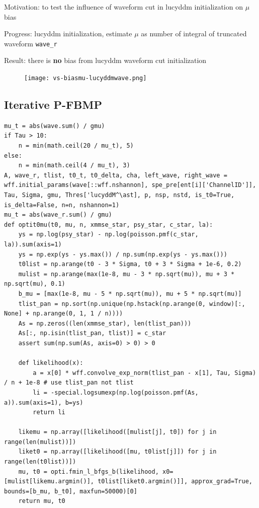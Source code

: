 \documentclass[notitlepage]{article}
\begin{document}
Motivation: to test the influence of waveform cut in lucyddm initialization on $\mu$ bias

Progress: lucyddm initialization, estimate $\mu$ as number of integral of truncated waveform \texttt{wave\_r}

Result: there is \textbf{no} bias from lucyddm waveform cut initialization

\begin{figure}[H]
    \centering
    \texttt{[image: vs-biasmu-lucyddmwave.png]}
\end{figure}

\subsection{Iterative P-FBMP}

\begin{lstlisting}
mu_t = abs(wave.sum() / gmu)
if Tau > 10:
    n = min(math.ceil(20 / mu_t), 5)
else:
    n = min(math.ceil(4 / mu_t), 3)
A, wave_r, tlist, t0_t, t0_delta, cha, left_wave, right_wave = wff.initial_params(wave[::wff.nshannon], spe_pre[ent[i]['ChannelID']], Tau, Sigma, gmu, Thres['lucyddM^\ast], p, nsp, nstd, is_t0=True, is_delta=False, n=n, nshannon=1)
mu_t = abs(wave_r.sum() / gmu)
def optit0mu(t0, mu, n, xmmse_star, psy_star, c_star, la):
    ys = np.log(psy_star) - np.log(poisson.pmf(c_star, la)).sum(axis=1)
    ys = np.exp(ys - ys.max()) / np.sum(np.exp(ys - ys.max()))
    t0list = np.arange(t0 - 3 * Sigma, t0 + 3 * Sigma + 1e-6, 0.2)
    mulist = np.arange(max(1e-8, mu - 3 * np.sqrt(mu)), mu + 3 * np.sqrt(mu), 0.1)
    b_mu = [max(1e-8, mu - 5 * np.sqrt(mu)), mu + 5 * np.sqrt(mu)]
    tlist_pan = np.sort(np.unique(np.hstack(np.arange(0, window)[:, None] + np.arange(0, 1, 1 / n))))
    As = np.zeros((len(xmmse_star), len(tlist_pan)))
    As[:, np.isin(tlist_pan, tlist)] = c_star
    assert sum(np.sum(As, axis=0) > 0) > 0

    def likelihood(x):
        a = x[0] * wff.convolve_exp_norm(tlist_pan - x[1], Tau, Sigma) / n + 1e-8 # use tlist_pan not tlist
        li = -special.logsumexp(np.log(poisson.pmf(As, a)).sum(axis=1), b=ys)
        return li

    likemu = np.array([likelihood([mulist[j], t0]) for j in range(len(mulist))])
    liket0 = np.array([likelihood([mu, t0list[j]]) for j in range(len(t0list))])
    mu, t0 = opti.fmin_l_bfgs_b(likelihood, x0=[mulist[likemu.argmin()], t0list[liket0.argmin()]], approx_grad=True, bounds=[b_mu, b_t0], maxfun=50000)[0]
    return mu, t0


\end{lstlisting}
\end{document}
